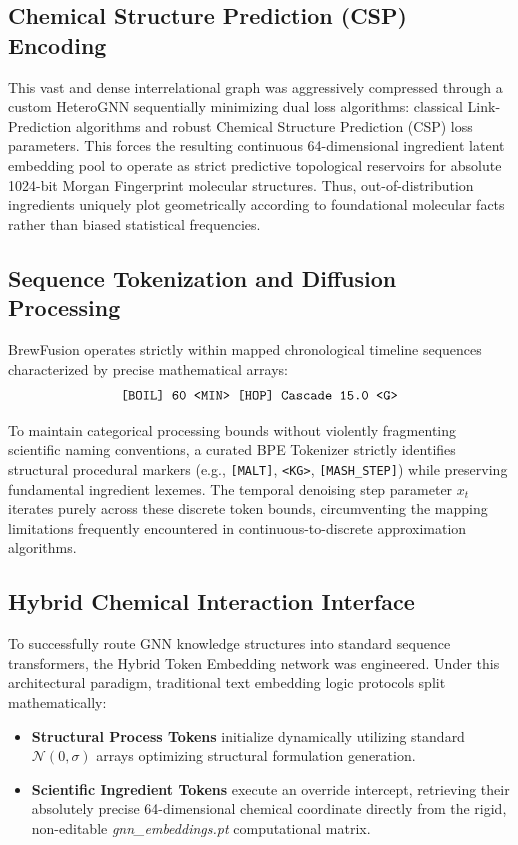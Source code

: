 \documentclass[10pt,twocolumn,letterpaper]{article}
\begin{document}
\subsection{Chemical Structure Prediction (CSP) Encoding}
This vast and dense interrelational graph was aggressively compressed through a custom HeteroGNN sequentially minimizing dual loss algorithms: classical Link-Prediction algorithms and robust Chemical Structure Prediction (CSP) loss parameters. This forces the resulting continuous 64-dimensional ingredient latent embedding pool to operate as strict predictive topological reservoirs for absolute 1024-bit Morgan Fingerprint molecular structures. Thus, out-of-distribution ingredients uniquely plot geometrically according to foundational molecular facts rather than biased statistical frequencies.

\subsection{Sequence Tokenization and Diffusion Processing}
BrewFusion operates strictly within mapped chronological timeline sequences characterized by precise mathematical arrays:
\[ \texttt{[BOIL] 60 \textless MIN\textgreater \ [HOP] Cascade 15.0 \textless G\textgreater} \]

To maintain categorical processing bounds without violently fragmenting scientific naming conventions, a curated BPE Tokenizer strictly identifies structural procedural markers (e.g., \texttt{[MALT]}, \texttt{\textless KG\textgreater}, \texttt{[MASH\_STEP]}) while preserving fundamental ingredient lexemes. The temporal denoising step parameter $x_t$ iterates purely across these discrete token bounds, circumventing the mapping limitations frequently encountered in continuous-to-discrete approximation algorithms.

\subsection{Hybrid Chemical Interaction Interface}
To successfully route GNN knowledge structures into standard sequence transformers, the Hybrid Token Embedding network was engineered. Under this architectural paradigm, traditional text embedding logic protocols split mathematically:
\begin{itemize}
    \item \textbf{Structural Process Tokens} initialize dynamically utilizing standard $\mathcal{N}(0, \sigma)$ arrays optimizing structural formulation generation.
    \item \textbf{Scientific Ingredient Tokens} execute an override intercept, retrieving their absolutely precise 64-dimensional chemical coordinate directly from the rigid, non-editable \textit{gnn\_embeddings.pt} computational matrix. 
\end{itemize}
\end{document}
